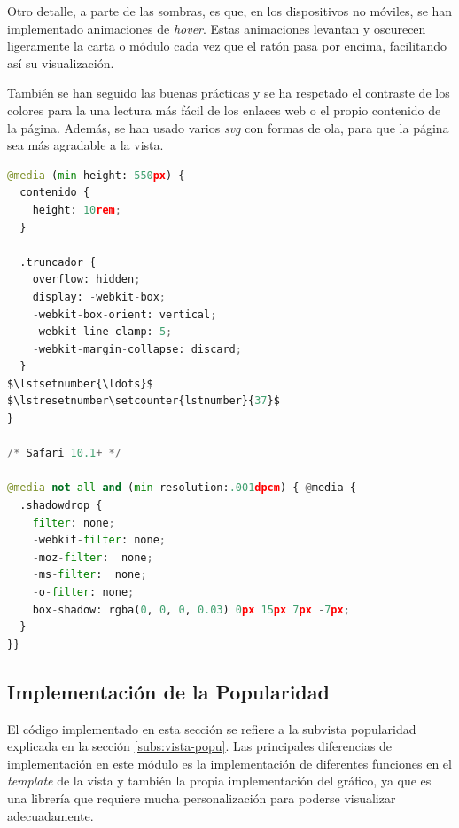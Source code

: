 \vspace{0.3cm}

Otro detalle, a parte de las sombras, es que, en los dispositivos no móviles, se han implementado animaciones de \textit{hover}. Estas animaciones levantan y oscurecen ligeramente la carta o módulo cada vez que el ratón pasa por encima, facilitando así su visualización.

\vspace{0.3cm}

También se han seguido las buenas prácticas y se ha respetado el contraste de los colores para la una lectura más fácil de los enlaces web o el propio contenido de la página. Además, se han usado varios \textit{svg} con formas de ola, para que la página sea más agradable a la vista.

\vspace{0.3cm}

\begin{lstlisting}[caption=Detalles de la implementación del diseño,language=Python, mathescape=true]
@media (min-height: 550px) {
  contenido {
    height: 10rem;
  }

  .truncador {
    overflow: hidden;
    display: -webkit-box;
    -webkit-box-orient: vertical;
    -webkit-line-clamp: 5;
    -webkit-margin-collapse: discard;
  }
$\lstsetnumber{\ldots}$
$\lstresetnumber\setcounter{lstnumber}{37}$
}

/* Safari 10.1+ */

@media not all and (min-resolution:.001dpcm) { @media {
  .shadowdrop {
    filter: none;
    -webkit-filter: none;
    -moz-filter:  none;
    -ms-filter:  none;
    -o-filter: none;
    box-shadow: rgba(0, 0, 0, 0.03) 0px 15px 7px -7px;
  }
}}
\end{lstlisting}

\subsection{Implementación de la Popularidad}
El código implementado en esta sección se refiere a la subvista popularidad explicada en la sección \ref{subs:vista-popu}. Las principales diferencias de implementación en este módulo es la implementación de diferentes funciones en el \textit{template} de la vista y también la propia implementación del gráfico, ya que es una librería que requiere mucha personalización para poderse visualizar adecuadamente.

\vspace{0.3cm}

